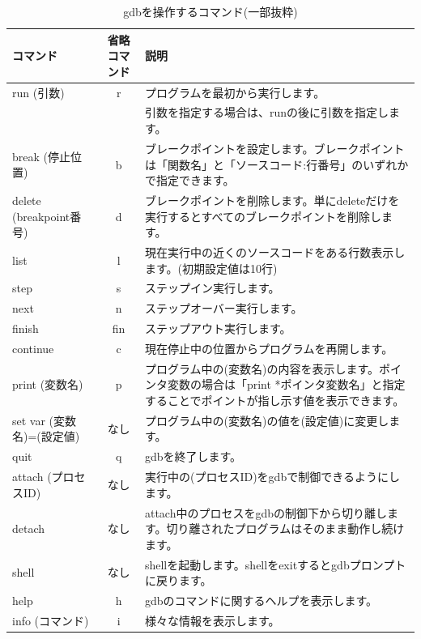 \documentclass[mingoth,a4paper]{jsarticle}
\begin{document}
\begin{table}[h]
\begin{center}
\caption{gdbを操作するコマンド(一部抜粋)}\label{table_use_gdb}
\begin{tabular}{|l|c|p{9cm}|}
\hline
コマンド & 省略コマンド & 説明 \\ \hline \hline
run (引数)& r & プログラムを最初から実行します。\\
 & & 引数を指定する場合は、runの後に引数を指定します。 \\ \hline
break (停止位置) & b & ブレークポイントを設定します。ブレークポイントは「関数名」と「ソースコード:行番号」のいずれかで指定できます。\\ \hline
delete (breakpoint番号)& d & ブレークポイントを削除します。単にdeleteだけを実行するとすべてのブレークポイントを削除します。\\ \hline
list & l & 現在実行中の近くのソースコードをある行数表示します。(初期設定値は10行)\\ \hline
step & s & ステップイン実行します。\\ \hline
next & n & ステップオーバー実行します。\\ \hline
finish & fin & ステップアウト実行します。\\ \hline
continue & c & 現在停止中の位置からプログラムを再開します。\\ \hline
print (変数名) & p & プログラム中の(変数名)の内容を表示します。ポインタ変数の場合は「print *ポインタ変数名」と指定することでポイントが指し示す値を表示できます。\\ \hline
set var (変数名)=(設定値) & なし & プログラム中の(変数名)の値を(設定値)に変更します。\\ \hline
quit & q & gdbを終了します。\\ \hline
attach (プロセスID)& なし & 実行中の(プロセスID)をgdbで制御できるようにします。\\ \hline
detach & なし & attach中のプロセスをgdbの制御下から切り離します。切り離されたプログラムはそのまま動作し続けます。\\ \hline
shell & なし & shellを起動します。shellをexitするとgdbプロンプトに戻ります。\\ \hline
help & h & gdbのコマンドに関するヘルプを表示します。\\ \hline
info (コマンド) & i & 様々な情報を表示します。\\ \hline
\end{tabular}
\end{center}
\end{table}
\end{document}
